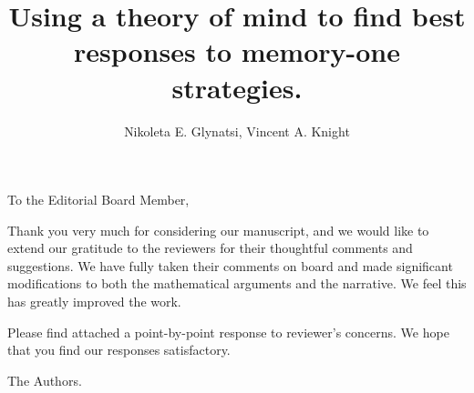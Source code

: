 \documentclass{article}
\title{Using a theory of mind to find best responses to memory-one strategies.}
\author{Nikoleta E. Glynatsi, Vincent A. Knight}
\begin{document}
\maketitle

To the Editorial Board Member,

Thank you very much for considering our manuscript, and we would like to extend
our gratitude to the reviewers for their thoughtful comments and suggestions. We
have fully taken their comments on board and made significant modifications to
both the mathematical arguments and the narrative. We feel this has greatly
improved the work.

Please find attached a point-by-point response to reviewer's concerns. We hope
that you find our responses satisfactory.

The Authors.
\end{document}
